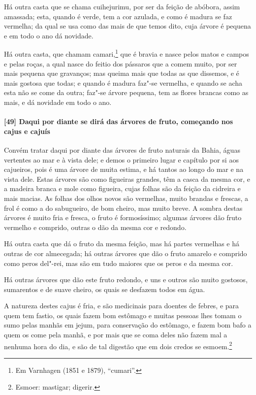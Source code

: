 Há outra casta que se chama cuihejurimu, por ser da feição de abóbora, assim amassada;
esta, quando é verde, tem a cor azulada, e como é madura se faz vermelha; da qual se usa
como das mais de que temos dito, cuja árvore é pequena e em todo o ano dá novidade.

Há outra casta, que chamam camari,\footnote{ Em Varnhagen (1851 e 1879), ``cumari''.} que
é bravia e nasce pelos matos e campos e pelas roças, a qual nasce do feitio dos pássaros
que a comem muito, por ser mais pequena que gravanços; mas queima mais que todas as que
dissemos, e é mais gostosa que todas; e quando é madura faz"-se vermelha, e quando se acha
esta não se come da outra; faz"-se árvore pequena, tem as flores brancas como as mais, e dá
novidade em todo o ano.

\paragraph{[49] Daqui por diante se dirá das árvores de fruto, começando nos cajus e cajuís}\quad
Convém tratar daqui por diante das árvores de fruto naturais da Bahia, águas vertentes ao
mar e à vista dele; e demos o primeiro lugar e capítulo por si aos cajueiros, pois é uma
árvore de muita estima, e há tantos ao longo do mar e na vista dele. Estas árvores são
como figueiras grandes, têm a casca da mesma cor, e a madeira branca e mole como figueira,
cujas folhas são da feição da cidreira e mais macias. As folhas dos olhos novos são
vermelhas, muito brandas e frescas, a frol é como a do sabugueiro, de bom cheiro, mas
muito breve. A sombra destas árvores é muito fria e fresca, o fruto é formosíssimo;
algumas árvores dão fruto vermelho e comprido, outras o dão da mesma cor e redondo.

Há outra casta que dá o fruto da mesma feição, mas há partes vermelhas e há outras de cor
almecegada; há outras árvores que dão o fruto amarelo e comprido como peros del"-rei, mas
são em tudo maiores que os peros e da mesma cor.

Há outras árvores que dão este fruto redondo, e uns e outros são muito gostosos,
sumarentos e de suave cheiro, os quais se desfazem todos em água.

A natureza destes cajus é fria, e são medicinais para doentes de febres, e para quem tem
fastio, os quais fazem bom estômago e muitas pessoas lhes tomam o sumo pelas manhãs em
jejum, para conservação do estômago, e fazem bom bafo a quem os come pela manhã, e por
mais que se coma deles não fazem mal a nenhuma hora do dia, e são de tal digestão que em
dois credos se esmoem.\footnote{ Esmoer: mastigar; digerir.}


